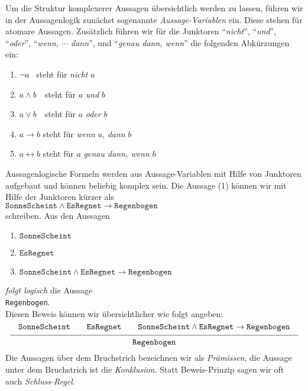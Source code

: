 Um die Struktur komplexerer Aussagen \"{u}bersichtlich werden zu lassen, f\"{u}hren wir in der Aussagenlogik zun\"{a}chst sogenannte
\emph{\color{blue}Aussage-Variablen} ein.  Diese stehen f\"{u}r atomare Aussagen.
Zus\"{a}tzlich f\"{u}hren wir f\"{u}r die Junktoren
``\textsl{nicht}'', ``\textsl{und}'', ``\textsl{oder}'', ``\textsl{wenn, $\cdots$ dann}'', und ``\textsl{genau dann, wenn}'' die
folgenden Abk\"{u}rzungen ein:
\begin{enumerate}
\item $\neg a$ \quad\quad\ steht f\"{u}r \quad \textsl{nicht} $a$ 
\item $a \wedge b$ \,\quad\ steht f\"{u}r \quad $a$ \textsl{und} $b$
\item $a \vee b$ \,\quad\ steht f\"{u}r \quad $a$ \textsl{oder} $b$
\item $a \rightarrow b$   \quad steht f\"{u}r \quad \textsl{wenn} $a$, \textsl{dann} $b$
\item $a \leftrightarrow b$ \quad steht f\"{u}r \quad  $a$ \textsl{genau dann, wenn} $b$
\end{enumerate}
Aussagenlogische Formeln werden aus Aussage-Variablen mit Hilfe von Junktoren aufgebaut
und k\"{o}nnen beliebig komplex sein.  Die Aussage (1) k\"{o}nnen wir mit Hilfe der Junktoren  k\"{u}rzer als
 \\[0.2cm]
\hspace*{1.3cm}
$\texttt{SonneScheint} \wedge \texttt{EsRegnet} \rightarrow \texttt{Regenbogen}$ 
\\[0.2cm]
schreiben.  Aus den Aussagen
\begin{enumerate}
\item $\texttt{SonneScheint}$
\item $\texttt{EsRegnet}$
\item $\texttt{SonneScheint} \wedge \texttt{EsRegnet} \rightarrow \texttt{Regenbogen}$
\end{enumerate}
\emph{\color{blue}folgt logisch} die Aussage \\[0.2cm]
\hspace*{1.3cm}  \texttt{Regenbogen}. 
\\[0.2cm]
Diesen Beweis k\"onnen wir \"ubersichtlicher wie folgt angeben: 
$$ \schluss{\texttt{SonneScheint} \quad\quad \texttt{EsRegnet} \quad\quad \texttt{SonneScheint} \wedge \texttt{EsRegnet} \rightarrow
       \texttt{Regenbogen}}{\texttt{Regenbogen}} 
$$
Die Aussagen \"{u}ber dem Bruchstrich bezeichnen wir als \emph{\color{blue}Pr\"{a}missen}, die Aussage unter dem Bruchstrich ist die \emph{\color{blue}Konklusion}.
Statt Beweis-Prinzip sagen wir oft auch \emph{\color{blue}Schluss-Regel}.

